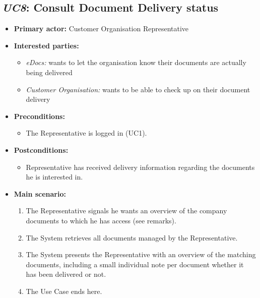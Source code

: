 \documentclass[a4paper,10pt]{article}
\begin{document}
\subsection{\emph{UC8}: Consult Document Delivery status}
\begin{itemize}
    \item \textbf{Primary actor:} Customer Organisation Representative
    \item \textbf{Interested parties:} 
        \begin{itemize}
            \item \textit{eDocs:} wants to let the organisation know their documents are actually being delivered
            \item \textit{Customer Organisation:} wants to be able to check up on their document delivery
        \end{itemize}

    \item \textbf{Preconditions:}
        \begin{itemize}
            \item The Representative is logged in (UC1).
        \end{itemize}

    \item \textbf{Postconditions:}
        \begin{itemize}
            \item Representative has received delivery information regarding the documents he is interested in.
        \end{itemize}
        
    \item \textbf{Main scenario:} 
    \begin{enumerate}
       \item The Representative signals he wants an overview of the company documents to which he has access (see remarks).
       \item The System retrieves all documents managed by the Representative.
       \item The System presents the Representative with an overview of the matching documents, including a small individual note per document whether it has been delivered or not.
       \item The Use Case ends here.
    \end{enumerate}


\end{itemize}
\end{document}
